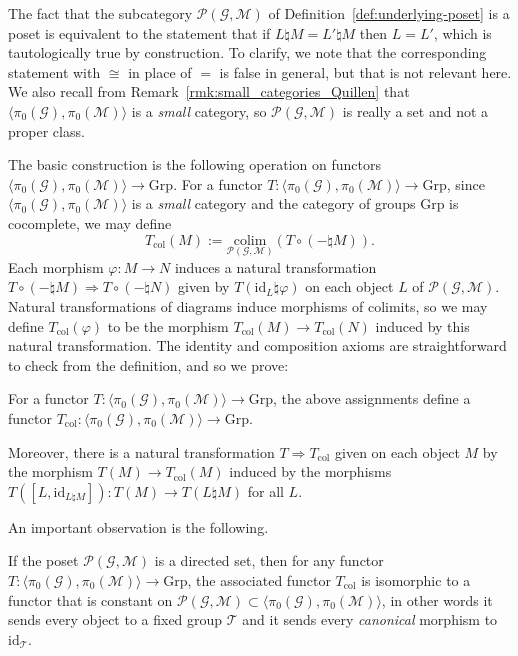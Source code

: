\documentclass[AHL,Unicode,published]{cedram}
\newcommand{\id}{\mathrm{id}}
\newcommand{\colim}{\mathrm{colim}}
\newcommand{\groups}{\ensuremath{\mathrm{Grp}}}
\newcommand{\col}{\mathrm{col}}
\newcommand{\cG}{\mathcal{G}}
\newcommand{\cM}{\mathcal{M}}
\newcommand{\cP}{\mathcal{P}}
\newcommand{\cT}{\mathcal{T}}
\begin{document}
\begin{rema}
The fact that the subcategory $\cP(\cG,\cM)$ of Definition~\ref{def:underlying-poset} is a poset is equivalent to the statement that if $L \natural M = L' \natural M$ then $L = L'$, which is tautologically true by construction. To clarify, we note that the corresponding statement with $\cong$ in place of $=$ is false in general, but that is not relevant here. We also recall from Remark~\ref{rmk:small_categories_Quillen} that $\langle \pi_{0}(\cG), \pi_{0}(\cM) \rangle$ is a \emph{small} category, so $\cP(\cG,\cM)$ is really a set and not a proper class.
\end{rema}

The basic construction is the following operation on functors $\langle \pi_{0}(\cG), \pi_{0}(\cM) \rangle \to \groups$. For a functor $T \colon \langle \pi_{0}(\cG), \pi_{0}(\cM) \rangle \to \groups$, since $\langle \pi_{0}(\cG), \pi_{0}(\cM) \rangle$ is a \emph{small} category and the category of groups $\groups$ is cocomplete, we may define
\begin{equation}\label{eq:Tcol}
T_{\col}(M) := \underset{\cP(\cG,\cM)}{\colim}(T \circ (- \natural M)).
\end{equation}
Each morphism $\varphi \colon M \to N$ induces a natural transformation $T \circ (- \natural M) \Rightarrow T \circ (- \natural N)$ given by $T(\id_{L} \natural \varphi)$ on each object $L$ of $\cP(\cG,\cM)$. Natural transformations of diagrams induce morphisms of colimits, so we may define $T_{\col}(\varphi)$ to be the morphism $T_{\col}(M) \to T_{\col}(N)$ induced by this natural transformation. The identity and composition axioms are straightforward to check from the definition, and so we prove:

\begin{lemm}\label{lem:stabilised-functor-to-groups}
For a functor $T \colon \langle \pi_{0}(\cG), \pi_{0}(\cM) \rangle \to \groups$, the above assignments define a functor $T_{\col} \colon \langle \pi_{0}(\cG), \pi_{0}(\cM) \rangle \to \groups$.
\end{lemm}

Moreover, there is a natural transformation $T \Rightarrow T_{\col}$ given on each object $M$ by the morphism $T(M) \to T_{\col}(M)$ induced by the morphisms $T([L,\id_{L \natural M}]) \colon T(M) \to T(L \natural M)$ for all $L$.

An important observation is the following.

\begin{lemm}\label{lem:isomorphic-to-constant}
If the poset $\cP(\cG,\cM)$ is a directed set, then for any functor $T \colon \langle \pi_{0}(\cG), \pi_{0}(\cM) \rangle \to \groups$, the associated functor $T_{\col}$ is isomorphic to a functor that is constant on $\cP(\cG,\cM) \subset \langle \pi_{0}(\cG), \pi_{0}(\cM) \rangle$, in other words it sends every object to a fixed group $\cT$ and it sends every \emph{canonical} morphism to $\id_\cT$.
\end{lemm}
\end{document}
